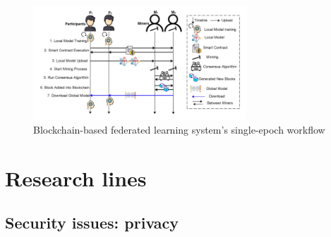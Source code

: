 \documentclass{article}
\begin{document}
\begin{figure}[!ht]
    \centering
    \includegraphics[width=8cm]{assets/blockchain-FL-workflow.png}
    \caption{Blockchain-based federated learning system's single-epoch workflow}
    \label{ Structure FL}
\end{figure}

\section{Research lines}

\subsection{Security issues: privacy}
\end{document}
